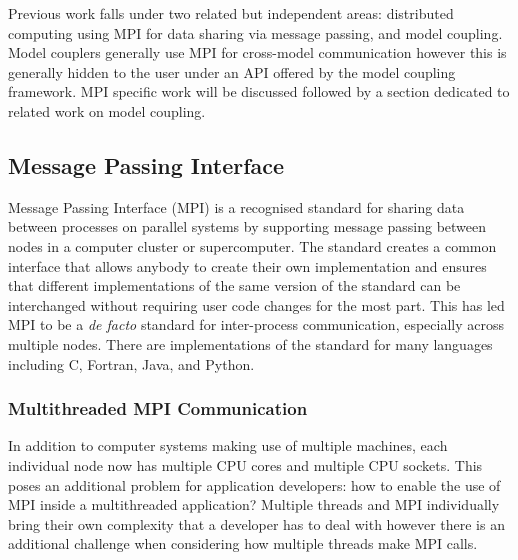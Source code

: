 \documentclass{acm_proc_article-sp}
\renewcommand{\_}{\underscore\hspace{0pt}}
\begin{document}
Previous work falls under two related but independent areas: distributed
computing using MPI for data sharing via message passing, and model coupling.
Model couplers generally use MPI for cross-model communication however this is
generally hidden to the user under an API offered by the model coupling
framework. MPI specific work will be discussed followed by a section dedicated
to related work on model coupling.

\subsection*{Message Passing Interface}

Message Passing Interface (MPI) is a recognised standard for sharing data
between processes on parallel systems by supporting message passing between
nodes in a computer cluster or supercomputer. The standard creates a common
interface that allows anybody to create their own implementation and ensures
that different implementations of the same version of the standard can be
interchanged without requiring user code changes for the most part. This has led
MPI to be a \textit{de facto} standard for inter-process communication,
especially across multiple nodes. There are implementations of the standard for
many languages including C, Fortran, Java, and Python.

\subsubsection*{Multithreaded MPI Communication}

In addition to computer systems making use of multiple machines, each individual
node now has multiple CPU cores and multiple CPU sockets. This poses an
additional problem for application developers: how to enable the use of MPI
inside a multithreaded application? Multiple threads and MPI individually bring
their own complexity that a developer has to deal with however there is an
additional challenge when considering how multiple threads make MPI calls.
\end{document}
